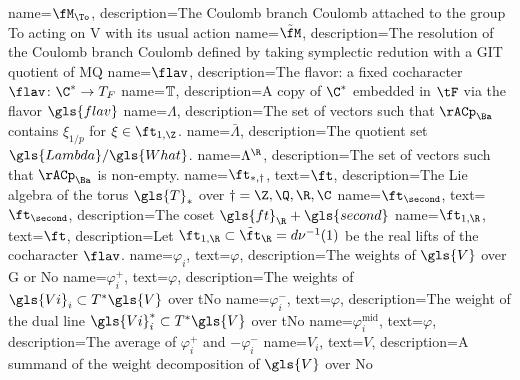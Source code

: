       {
     name={\ensuremath{\fM_{\To}}},
   description={The Coulomb branch \gls{Coulomb} attached to the group
  \gls{To} acting on \gls{V} with its usual action}
 }
 {
     name={\ensuremath{\tilde{\fM}}},
   description={The resolution of the Coulomb branch \gls{Coulomb}
  defined by taking symplectic redution with a GIT quotient of \gls{MQ}}
 }
  {
     name={\ensuremath{\flav}},
   description={The flavor: a fixed cocharacter $\flav\colon \C^*\to T_{F}$}
 }
     {
     name={\ensuremath{\bT}},
   description={A copy of $\C^*$ embedded in $\tF$ via the flavor $\gls{flav}$}
 }
      {
     name={\ensuremath{\Lambda}},
   description={The set of vectors such that $\rACp_{\Ba}$
  contains $\xi_{1/p}$ for $\xi\in \ft_{1,\Z}$.}
 }
       {
     name={\ensuremath{\bar{\Lambda}}},
   description={The quotient set $\gls{Lambda}/\gls{What}$.}
 }
       {
     name={\ensuremath{\Lambda^{\R}}},
   description={The set of vectors such that $\rACp_{\Ba}$
 is non-empty.}
 }
    {
     name={\ensuremath{\ft_{*,\dagger}}}, 
     text={\ensuremath{\ft}},
   description={The Lie algebra of the torus $\gls{T}_{*}$ over $\dagger=\Z,\Q,\R,\C$}
 }
     {
     name={\ensuremath{\ft_{\second}}}, 
     text={\ensuremath{\ft_{\second}}},
   description={The coset $\gls{ft}_{\R}+\gls{second}$}
 }
    {
     name={\ensuremath{\ft_{1,\R}}}, 
     text={\ensuremath{\ft}},
   description={Let $\ft_{1,\R}\subset\tilde{\ft}_{\R}=d\nu^{-1}(1)$ be the real
lifts of the cocharacter $\flav$. }
 }
      {
       name={\ensuremath{\varphi_i}},
     text={\ensuremath{\varphi}},
   description={The weights of  $ \gls{V}$ over \gls{G} or \gls{No}}
 }
      {
       name={\ensuremath{\varphi_i^+}},
     text={\ensuremath{\varphi}},
   description={The weights of  $\gls{Vi}_i\subset T^*\gls{V}$ over \gls{tNo}}
 }
       {
       name={\ensuremath{\varphi_i^-}},
     text={\ensuremath{\varphi}},
   description={The weight of the dual line  $\gls{Vi}_i^*\subset T^*\gls{V}$ over \gls{tNo}}
 }
        {
       name={\ensuremath{\varphi_i^{\operatorname{mid}}}},
     text={\ensuremath{\varphi}},
   description={The average of $\varphi_i^+$ and $-\varphi_i^-$}
 }
      {
       name={\ensuremath{V_i}},
     text={\ensuremath{V}},
   description={A summand of the  weight decomposition of $\gls{V}$ over \gls{No}}
 }

